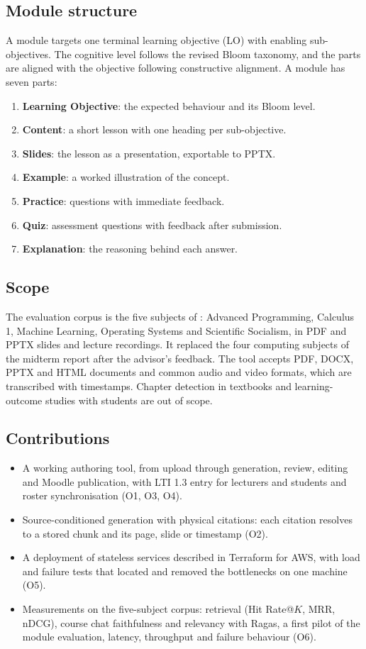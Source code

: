 \subsection{Module structure}\label{sec:module-structure}
A module targets one terminal learning objective (LO) with enabling sub-objectives. The cognitive level follows the revised Bloom taxonomy\citep{bloom}, and the parts are aligned with the objective following constructive alignment\citep{alignment}. A module has seven parts:
\begin{enumerate}[leftmargin=*,nosep]
\item \textbf{Learning Objective}: the expected behaviour and its Bloom level.
\item \textbf{Content}: a short lesson with one heading per sub-objective.
\item \textbf{Slides}: the lesson as a presentation, exportable to PPTX.
\item \textbf{Example}: a worked illustration of the concept.
\item \textbf{Practice}: questions with immediate feedback.
\item \textbf{Quiz}: assessment questions with feedback after submission.
\item \textbf{Explanation}: the reasoning behind each answer.
\end{enumerate}
\subsection{Scope}\label{sec:scope}
The evaluation corpus is the five subjects of : Advanced Programming, Calculus 1, Machine Learning, Operating Systems and Scientific Socialism, in PDF and PPTX slides and lecture recordings. It replaced the four computing subjects of the midterm report after the advisor's feedback. The tool accepts PDF, DOCX, PPTX and HTML documents and common audio and video formats, which are transcribed with timestamps. Chapter detection in textbooks and learning-outcome studies with students are out of scope.
\subsection{Contributions}
\begin{itemize}[leftmargin=*,nosep]
\item A working authoring tool, from upload through generation, review, editing and Moodle publication, with LTI 1.3 entry for lecturers and students and roster synchronisation (O1, O3, O4).
\item Source-conditioned generation with physical citations: each citation resolves to a stored chunk and its page, slide or timestamp (O2).
\item A deployment of stateless services described in Terraform for AWS, with load and failure tests that located and removed the bottlenecks on one machine (O5).
\item Measurements on the five-subject corpus: retrieval (Hit Rate@$K$, MRR, nDCG), course chat faithfulness and relevancy with Ragas, a first pilot of the module evaluation, latency, throughput and failure behaviour (O6).
\end{itemize}
